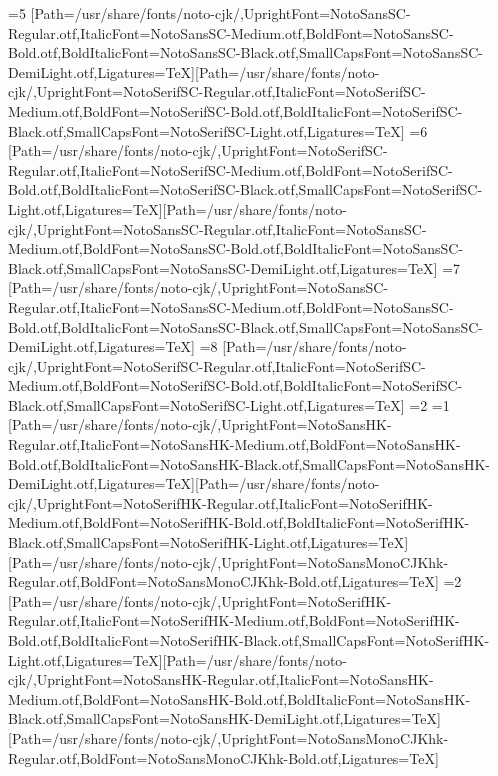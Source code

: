 \else\ifnum\value{CJKFonts}=5
[Path=/usr/share/fonts/noto-cjk/,UprightFont=NotoSansSC-Regular.otf,ItalicFont=NotoSansSC-Medium.otf,BoldFont=NotoSansSC-Bold.otf,BoldItalicFont=NotoSansSC-Black.otf,SmallCapsFont=NotoSansSC-DemiLight.otf,Ligatures=TeX][Path=/usr/share/fonts/noto-cjk/,UprightFont=NotoSerifSC-Regular.otf,ItalicFont=NotoSerifSC-Medium.otf,BoldFont=NotoSerifSC-Bold.otf,BoldItalicFont=NotoSerifSC-Black.otf,SmallCapsFont=NotoSerifSC-Light.otf,Ligatures=TeX]
\else\ifnum\value{CJKFonts}=6
[Path=/usr/share/fonts/noto-cjk/,UprightFont=NotoSerifSC-Regular.otf,ItalicFont=NotoSerifSC-Medium.otf,BoldFont=NotoSerifSC-Bold.otf,BoldItalicFont=NotoSerifSC-Black.otf,SmallCapsFont=NotoSerifSC-Light.otf,Ligatures=TeX][Path=/usr/share/fonts/noto-cjk/,UprightFont=NotoSansSC-Regular.otf,ItalicFont=NotoSansSC-Medium.otf,BoldFont=NotoSansSC-Bold.otf,BoldItalicFont=NotoSansSC-Black.otf,SmallCapsFont=NotoSansSC-DemiLight.otf,Ligatures=TeX]
\else\ifnum\value{CJKFonts}=7
[Path=/usr/share/fonts/noto-cjk/,UprightFont=NotoSansSC-Regular.otf,ItalicFont=NotoSansSC-Medium.otf,BoldFont=NotoSansSC-Bold.otf,BoldItalicFont=NotoSansSC-Black.otf,SmallCapsFont=NotoSansSC-DemiLight.otf,Ligatures=TeX]
\else\ifnum\value{CJKFonts}=8
[Path=/usr/share/fonts/noto-cjk/,UprightFont=NotoSerifSC-Regular.otf,ItalicFont=NotoSerifSC-Medium.otf,BoldFont=NotoSerifSC-Bold.otf,BoldItalicFont=NotoSerifSC-Black.otf,SmallCapsFont=NotoSerifSC-Light.otf,Ligatures=TeX]
\fi\fi\fi\fi\fi\fi\fi\fi\else
\ifnum\value{CJKLanguage}=2
\ifnum\value{CJKFonts}=1
[Path=/usr/share/fonts/noto-cjk/,UprightFont=NotoSansHK-Regular.otf,ItalicFont=NotoSansHK-Medium.otf,BoldFont=NotoSansHK-Bold.otf,BoldItalicFont=NotoSansHK-Black.otf,SmallCapsFont=NotoSansHK-DemiLight.otf,Ligatures=TeX][Path=/usr/share/fonts/noto-cjk/,UprightFont=NotoSerifHK-Regular.otf,ItalicFont=NotoSerifHK-Medium.otf,BoldFont=NotoSerifHK-Bold.otf,BoldItalicFont=NotoSerifHK-Black.otf,SmallCapsFont=NotoSerifHK-Light.otf,Ligatures=TeX][Path=/usr/share/fonts/noto-cjk/,UprightFont=NotoSansMonoCJKhk-Regular.otf,BoldFont=NotoSansMonoCJKhk-Bold.otf,Ligatures=TeX]
\else\ifnum\value{CJKFonts}=2
[Path=/usr/share/fonts/noto-cjk/,UprightFont=NotoSerifHK-Regular.otf,ItalicFont=NotoSerifHK-Medium.otf,BoldFont=NotoSerifHK-Bold.otf,BoldItalicFont=NotoSerifHK-Black.otf,SmallCapsFont=NotoSerifHK-Light.otf,Ligatures=TeX][Path=/usr/share/fonts/noto-cjk/,UprightFont=NotoSansHK-Regular.otf,ItalicFont=NotoSansHK-Medium.otf,BoldFont=NotoSansHK-Bold.otf,BoldItalicFont=NotoSansHK-Black.otf,SmallCapsFont=NotoSansHK-DemiLight.otf,Ligatures=TeX][Path=/usr/share/fonts/noto-cjk/,UprightFont=NotoSansMonoCJKhk-Regular.otf,BoldFont=NotoSansMonoCJKhk-Bold.otf,Ligatures=TeX]
